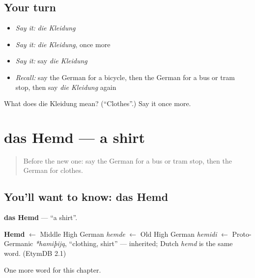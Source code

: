\subsection*{Your turn}
\begin{itemize}
\raggedright
  \item \emph{Say it:} \emph{die Kleidung}
  \item \emph{Say it:} \emph{die Kleidung}, once more
  \item \emph{Say it:} say \emph{die Kleidung}
  \item \emph{Recall:} say the German for a bicycle, then the German for a bus or tram stop, then say \emph{die Kleidung} again
\end{itemize}

\begin{tcolorbox}[breakable,colback=teal!4,colframe=teal!35!black,title={Before you move on}]
What does die Kleidung mean? (\textquotedblleft{}Clothes\textquotedblright{}.) Say it once more.
\end{tcolorbox}
\section[das Hemd]{das Hemd — a shirt}

\label{lesson:GE-C98-hemd}



\begin{quote}
Before the new one: say the German for a bus or tram stop, then the German for clothes.
\end{quote}

\subsection*{You'll want to know: das Hemd}
\textbf{das Hemd} — \textquotedblleft{}a shirt\textquotedblright{}.

\begin{cousinweb}
\textbf{Hemd} $\leftarrow$ Middle High German \emph{hemde} $\leftarrow$ Old High German \emph{hemidi} $\leftarrow$ Proto-Germanic \emph{*hamiþiją}, \textquotedblleft{}clothing, shirt\textquotedblright{} — inherited; Dutch \emph{hemd} is the same word. (EtymDB 2.1)
\end{cousinweb}

\begin{grammarlens}[title={What you've built}]
One more word for this chapter.
\end{grammarlens}

